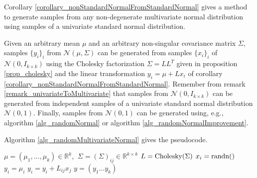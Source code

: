 Corollary \ref{corollary_nonStandardNormalFromStandardNormal} gives a method to generate samples from any non-degenerate multivariate normal distribution using samples of a univariate standard normal distribution. 

Given an arbitrary mean $\mu$ and an arbitrary non-singular covariance matrix $\Sigma$, samples $\{y_i\}_i$ from $\mathcal{N}(\mu,\Sigma)$ can be generated from samples $\{x_i\}_i$ of $\mathcal{N}(0,I_{k \times k})$ using the Cholesky factorization $\Sigma = LL^T$ given in proposition \ref{prop_cholesky} and the linear transformation $y_i = \mu + Lx_i$ of corollary \ref{corollary_nonStandardNormalFromStandardNormal}. 
Remember from remark \ref{remark_univariateToMultivariate} that samples from $\mathcal{N}(0,I_{k \times k})$ can be generated from independent samples of a univariate standard normal distribution $\mathcal{N}(0,1)$.
Finally, samples from $\mathcal{N}(0,1)$ can be generated using, e.g., algorithm \ref{alg_randomNormal} or algorithm \ref{alg_randomNormalImprovement}. 

Algorithm \ref{alg_randomMultivariateNormal} gives the pseudocode.

\vspace{5mm}
\begin{algorithm}[H]
\SetAlgoLined
   $\mu = (\mu_1, \dots, \mu_k) \in \mathbb{R}^k$, $ \ \Sigma = \left( \Sigma \right)_{ij} \in \mathbb{R}^{k \times k}$\;
  $L = \textup{Cholesky}(\Sigma)$\;
  {
    $x_i = \textup{randn}()$\;
    $y_i = \mu_i$\;
    {
      $y_i = y_i + L_{ij} x_j$\;
    }    
  }
   $y = (y_1 \dots y_k)$\;
\caption[Random numbers from a multivariate normal distribution]
{
Algorithm to get samples from a multivariate normal distribution $\mathcal{N}(\mu,\Sigma)$. $\textup{Cholesky}(\Sigma)$ returns a matrix $L$ according to the Cholesky factorization $\Sigma = LL^T$ (\ref{prop_cholesky}). $\textup{randn}()$ returns a random number generated from a univariate standard normal distribution (Algorithms \ref{alg_randomNormal} and \ref{alg_randomNormalImprovement} can be used for this purpose). 
}
\label{alg_randomMultivariateNormal}
\end{algorithm}
\vspace{5mm}
 
